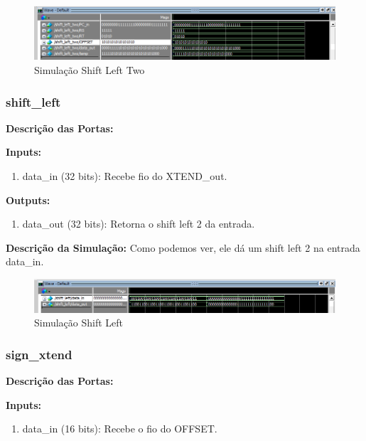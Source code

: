 \begin{figure}[htbp!]
\centering
\includegraphics[width=1\textwidth]{figure/simulacao_shift_left_two.png}
\caption{Simulação Shift Left Two} 
\label{fig:imagem_massa}
\end{figure}

\subsubsection{shift\_left}
\textbf{Descrição das Portas:}

\textbf{Inputs:}

\begin{enumerate}
    \item data\_in (32 bits): Recebe fio do XTEND\_out.

\end{enumerate}

\textbf{Outputs:}

\begin{enumerate}
    \item data\_out (32 bits): Retorna o shift left 2 da entrada.
\end{enumerate}

\textbf{Descrição da Simulação:} Como podemos ver, ele dá um shift left 2 na entrada data\_in.

\begin{figure}[htbp!]
\centering
\includegraphics[width=1\textwidth]{figure/simulacao_shift_left.png}
\caption{Simulação Shift Left} 
\label{fig:imagem_massa}
\end{figure}

\subsubsection{sign\_xtend}
\textbf{Descrição das Portas:}

\textbf{Inputs:}

\begin{enumerate}
    \item data\_in (16 bits): Recebe o fio do OFFSET.

\end{enumerate}

